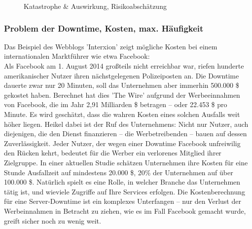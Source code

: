 \documentclass[letterpaper, 12pt]{article}
\let\tempsubsubsection\subsubsection
\renewcommand\subsubsection[1]{\vspace{0cm}\tempsubsubsection{#1}\vspace{0cm}}
\begin{document}
\begin{figure}[h]
\caption{Katastrophe \& Auswirkung, Risikoabschätzung} 
\end{figure} 
\newpage

\subsubsection{Problem der Downtime, Kosten, max. Häufigkeit}

Das Beispiel des Webblogs 'Interxion' zeigt mögliche Kosten bei einem internationalen Marktführer wie etwa Facebook: \\
Als Facebook am 1. August 2014 großteils nicht erreichbar war, riefen hunderte amerikanischer Nutzer ihren nächstgelegenen Polizeiposten an. Die Downtime dauerte zwar nur 20 Minuten, soll das Unternehmen aber immerhin 500.000 \$ gekostet haben. Berechnet hat dies 'The Wire' aufgrund der Werbeeinnahmen von Facebook, die im Jahr 2,91 Milliarden \$ betragen – oder 22.453 \$ pro Minute. Es wird geschätzt, dass die wahren Kosten eines solchen Ausfalls weit höher liegen. Heikel dabei ist der Ruf des Unternehmens: Nicht nur Nutzer, auch diejenigen, die den Dienst finanzieren – die Werbetreibenden – bauen auf dessen Zuverlässigkeit. Jeder Nutzer, der wegen einer Downtime Facebook unfreiwilig den Rücken kehrt, bedeutet für die Werber ein verlorenes Mitglied ihrer Zielgruppe. In einer aktuellen Studie schätzen Unternehmen ihre Kosten für eine Stunde Ausfallzeit auf mindestens 20.000 \$, 20\% der Unternehmen auf über 100.000 \$. Natürlich spielt es eine Rolle, in welcher Branche das Unternehmen tätig ist, und wieviele Zugriffe auf Ihre Services erfolgen. Die Kostenberechnung für eine Server-Downtime ist ein komplexes Unterfangen –  nur den Verlust der Werbeinnahmen in Betracht zu ziehen, wie es im Fall Facebook gemacht wurde, greift sicher noch zu wenig weit.
\end{document}
